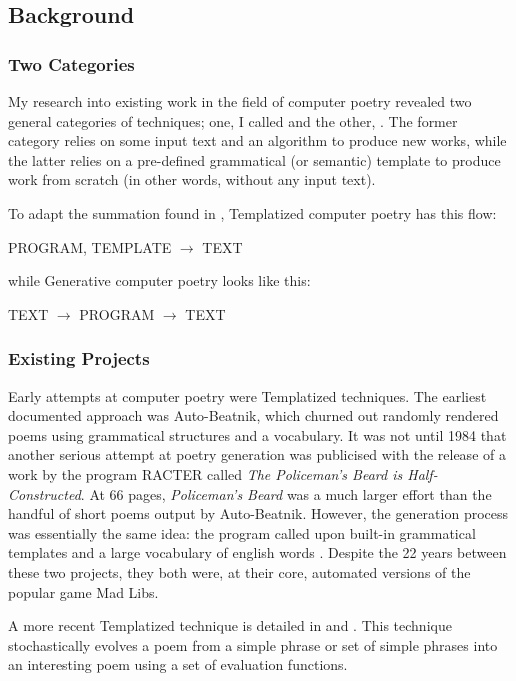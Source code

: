\documentclass[10pt]{article}
\begin{document}
\subsection{Background}
\subsubsection{Two Categories}
My research into existing work in the field of computer poetry revealed two
general categories of techniques; one, I called  and the other,
. The former category relies on some input text and an
algorithm to produce new works, while the latter relies on a pre-defined
grammatical (or semantic) template to produce work from scratch (in other
words, without any input text).  

To adapt the summation found in \cite{Hart96}, Templatized computer poetry has this flow:
\begin{center}
\begin{boxed}
PROGRAM, TEMPLATE $\rightarrow$ TEXT
\end{boxed}
\end{center}
while Generative computer poetry looks like this:
\begin{center}
\begin{boxed}
TEXT $\rightarrow$ PROGRAM $\rightarrow$ TEXT
\end{boxed}
\end{center}

\subsubsection{Existing Projects}
Early attempts at computer poetry were Templatized techniques. The earliest
documented approach was Auto-Beatnik, which churned out randomly rendered poems
using grammatical structures and a vocabulary.  It was not until 1984 that
another serious attempt at poetry generation was publicised with the release of
a work by the program RACTER called \emph{The Policeman's Beard is
Half-Constructed}. At 66 pages, \emph{Policeman's Beard} was a much larger
effort than the handful of short poems output by Auto-Beatnik. However, the
generation process was essentially the same idea: the program called upon
built-in grammatical templates and a large vocabulary of english words
\cite{Chamb84}. Despite the 22 years between these two projects, they both
were, at their core, automated versions of the popular game Mad Libs.

A more recent Templatized technique is detailed in \cite{Manurung00} and
\cite{Manurung03}. This technique stochastically evolves a poem from a simple
phrase or set of simple phrases into an interesting poem using a set of
evaluation functions.
\end{document}
